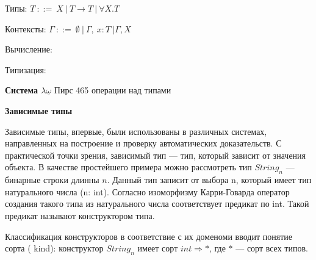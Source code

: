 Типы: $T \ ::= \ X \ | \ T \rightarrow T \ | \ \forall X.T$

Контексты: $\Gamma \ ::= \ \emptyset \ | \ \Gamma , \ x:T \ | \Gamma , X$

Вычисление:


Типизация: 



\textbf {Система $\lambda{\underline {\omega }}$}
Пирс 465 операции над типами 

\textbf{Зависимые типы}

Зависимые типы, впервые, были использованы в различных системах, направленных 
на построение и проверку автоматических доказательств. С практической точки 
зрения, зависимый тип --- тип, который зависит от значения объекта. В 
качестве простейшего примера можно рассмотреть тип $String_{n}$ --- бинарные 
строки длинны $n$. Данный тип записит от выбора n, который имеет 
тип натурального числа (n: int). Согласно изоморфизму Карри-Говарда  оператор 
создания такого типа из натурального числа соответствует предикат по int. 
Такой предикат называют конструктором типа\cite{lectures}.

Классификация конструкторов в соответствие с их доменоми вводит понятие сорта (
kind): конструктор $String_{n}$ имеет сорт $int \Rightarrow *$, где $*$ --- сорт всех типов.

